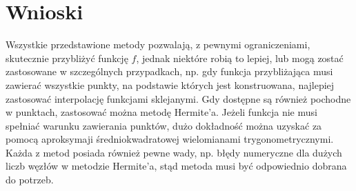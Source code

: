 \documentclass{article}
\begin{document}
\section{Wnioski}
Wszystkie przedstawione metody pozwalają, z pewnymi ograniczeniami, skutecznie przybliżyć funkcję $f$, jednak niektóre robią to lepiej,
lub mogą zostać zastosowane w szczególnych przypadkach, np. gdy funkcja przybliżająca musi zawierać wszystkie punkty, na podstawie
których jest konstruowana, najlepiej zastosować interpolację funkcjami sklejanymi. Gdy dostępne są również pochodne w punktach, 
zastosować można metodę Hermite'a. Jeżeli funkcja nie musi spełniać warunku zawierania punktów, dużo dokładność można uzyskać za
pomocą aproksymaji średniokwadratowej wielomianami trygonometrycznymi. Każda z metod posiada również pewne wady, np. błędy numeryczne
dla dużych liczb węzłów w metodzie Hermite'a, stąd metoda musi być odpowiednio dobrana do potrzeb.
\end{document}

